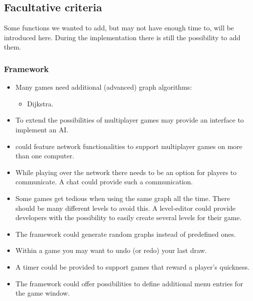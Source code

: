 \subsection{Facultative criteria}\label{REF:FACULTATIVE-CRITERIA}
Some functions we wanted to add, but may not have enough time to, will be introduced here. During the implementation there is still the possibility to add them.

\subsubsection{Framework}
\begin{itemize}

	\item Many \glspl{game} need additional (advanced) \gls{graph} \glspl{algorithm}:
	\begin{itemize}
		\item Dijkstra.
	\end{itemize}

	\item To extend the possibilities of multiplayer games {\graphioli} may provide an interface to implement an \gls{AI}.

	\item {\graphioli} could feature network functionalities to support multiplayer games on more than one computer.

	\item While playing over the network there needs to be an option for players to communicate. A \gls{chat} could provide such a communication.

	\item Some games get tedious when using the same graph all the time. There should be many different \glspl{level} to avoid this. A \gls{level-editor} could provide \glspl{developer} with the possibility to easily create several levels for their game.

	\item The framework could generate random graphs instead of predefined ones.

	\item Within a game you may want to \gls{undo} (or \gls{redo}) your last draw.

	\item A timer could be provided to support games that reward a player's quickness.

	\item The framework could offer possibilities to define additional menu entries for the game window.

\end{itemize}

